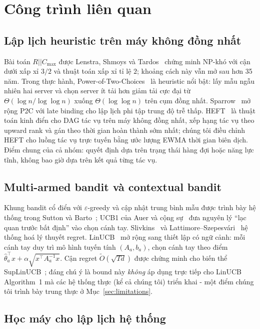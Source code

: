 \documentclass[final,5p,times,twocolumn]{elsarticle}
\begin{document}
\section{Công trình liên quan}
\label{sec:related}

\subsection{Lập lịch heuristic trên máy không đồng nhất}

Bài toán $R||C_{\max}$ được Lenstra, Shmoys và Tardos~\cite{lenstra1990} chứng minh NP-khó với cận dưới xấp xỉ $3/2$ và thuật toán xấp xỉ tỉ lệ $2$; khoảng cách này vẫn mở sau hơn 35 năm. Trong thực hành, Power-of-Two-Choices~\cite{mitzenmacher2001} là heuristic nổi bật: lấy mẫu ngẫu nhiên hai server và chọn server ít tải hơn giảm tải cực đại từ $\Theta(\log n/\log\log n)$ xuống $\Theta(\log\log n)$ trên cụm đồng nhất. Sparrow~\cite{sparrow} mở rộng P2C với late binding cho lập lịch phi tập trung độ trễ thấp. HEFT~\cite{heft} là thuật toán kinh điển cho DAG tác vụ trên máy không đồng nhất, xếp hạng tác vụ theo upward rank và gán theo thời gian hoàn thành sớm nhất; chúng tôi điều chỉnh HEFT cho luồng tác vụ trực tuyến bằng ước lượng EWMA thời gian biên dịch. Điểm chung của cả nhóm: quyết định dựa trên trạng thái hàng đợi hoặc năng lực tĩnh, không bao giờ dựa trên kết quả từng tác vụ.

\subsection{Multi-armed bandit và contextual bandit}

Khung bandit cổ điển với $\varepsilon$-greedy và cập nhật trung bình mẫu được trình bày hệ thống trong Sutton và Barto~\cite{sutton2018}; UCB1 của Auer và cộng sự~\cite{auer2002} đưa nguyên lý ``lạc quan trước bất định'' vào chọn cánh tay. Slivkins~\cite{slivkins2019} và Lattimore--Szepesv\'ari~\cite{lattimore2020} hệ thống hoá lý thuyết regret. LinUCB~\cite{li2010} mở rộng sang thiết lập có ngữ cảnh: mỗi cánh tay duy trì mô hình tuyến tính $(A_a,b_a)$, chọn cánh tay theo điểm $\hat{\theta}_a^\top x+\alpha\sqrt{x^\top A_a^{-1}x}$. Cận regret $\tilde{O}(\sqrt{Td})$ được chứng minh cho biến thể SupLinUCB~\cite{chu2011}; đáng chú ý là bound này \emph{không} áp dụng trực tiếp cho LinUCB Algorithm~1 mà các hệ thống thực (kể cả chúng tôi) triển khai - một điểm chúng tôi trình bày trung thực ở Mục~\ref{sec:limitations}.

\subsection{Học máy cho lập lịch hệ thống}
\end{document}
